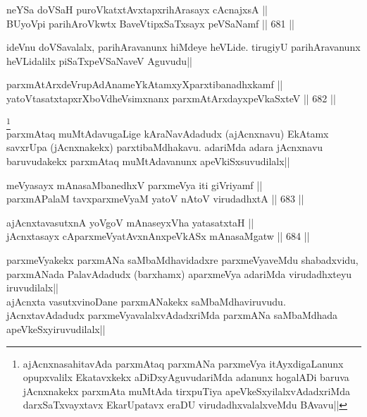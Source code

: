 
\begin{shl}
neYSa doVSaH puroVkatxtAvxtapxrihArasayx cAcnajxsA || \\
BUyoV\s pi parihAroVkwtx BaveVtipxSaTxsayx peVSaNamf ||  681 ||  
\end{shl}

\begin{artha} 
ideVnu doVSavalalx, parihAravanunx hiMdeye heVLide. tirugiyU 
parihAravanunx heVLidalilx piSaTxpeVSaNaveV Aguvudu||
\end{artha}


\begin{shl}
parxmAtArxdeVrupAdAnameYkAtamxyXparxtibanadhxkamf || \\
yatoV\s tasatxtapxrXboVdheV\s simxnanx parxmAtArxdayxpeVkaSxteV ||  682 ||  
\end{shl}

\begin{artha} 
\footnote[1]{ajAcnxnasahitavAda parxmAtaq parxmANa parxmeVya 
itAyxdigaLanunx opupxvalilx Ekatavxkekx aDiDxyAguvudariMda adanunx 
hogalADi baruva jAcnxnakekx parxmAta muMtAda tirxpuTiya 
apeVkeSxyilalxvAdadxriMda darxSaTxvayxtavx EkarUpatavx eraDU 
virudadhxvalalxveMdu BAvavu||}\\
parxmAtaq muMtAdavugaLige kAraNavAdadudx (ajAcnxnavu) EkAtamx savxrUpa 
(jAcnxnakekx) parxtibaMdhakavu. adariMda adara jAcnxnavu baruvudakekx 
parxmAtaq muMtAdavanunx apeVkiSxsuvudilalx||
\end{artha}


\begin{shl}
meVyasayx mAnasaMbanedhxV parxmeVya iti giVriyamf || \\
parxmAPalaM tavxparxmeVyaM yatoV nAtoV virudadhxtA ||  683 ||  
\end{shl}
				
\begin{shl}
ajAcnxtavasutxnA yoVgoV mAnaseyxVha yatasatxtaH || \\
jAcnxtasayx cAparxmeVyatAvxnAnxpeVkASx mAnasaMgatw ||  684 ||  
\end{shl}

\begin{artha} 
parxmeVyakekx parxmANa saMbaMdhavidadxre parxmeVyaveMdu shabadxvidu, 
parxmANada PalavAdadudx (barxhamx) aparxmeVya adariMda virudadhxteyu 
iruvudilalx||\\
ajAcnxta vasutxvinoDane parxmANakekx saMbaMdhaviruvudu. 
jAcnxtavAdadudx parxmeVyavalalxvAdadxriMda parxmANa saMbaMdhada 
apeVkeSxyiruvudilalx||
\end{artha}

